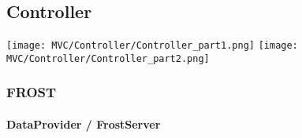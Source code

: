 \subsection{Controller}

\texttt{[image: MVC/Controller/Controller\_part1.png]}
\newpage
\texttt{[image: MVC/Controller/Controller\_part2.png]}

\subsubsection{FROST}

\paragraph{DataProvider / FrostServer}\mbox{}\\

